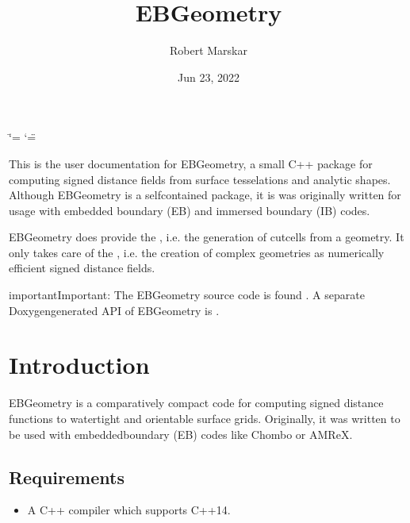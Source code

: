 \documentclass[letterpaper,10pt,english]{sphinxmanual}
\title{EBGeometry}
\date{Jun 23, 2022}
\author{Robert Marskar}
\begin{document}
\ifdefined\shorthandoff
  \ifnum\catcode`\=\string=\active\shorthandoff{=}\fi
  \ifnum\catcode`\"=\active{}\fi
\fi

\pagestyle{empty}
\sphinxmaketitle
\pagestyle{plain}
\sphinxtableofcontents
\pagestyle{normal}
\label{\detokenize{index::doc}}


\sphinxAtStartPar
This is the user documentation for EBGeometry, a small C++ package for computing signed distance fields from surface tesselations and analytic shapes.
Although EBGeometry is a self\sphinxhyphen{}contained package, it is was originally written for usage with embedded boundary (EB) and immersed boundary (IB) codes.

\sphinxAtStartPar
EBGeometry does provide the , i.e. the generation of cut\sphinxhyphen{}cells from a geometry.
It only takes care of the , i.e. the creation of complex geometries as numerically efficient signed distance fields.

\begin{sphinxadmonition}{important}{Important:}
\sphinxAtStartPar
The EBGeometry source code is found .
A separate Doxygen\sphinxhyphen{}generated API of EBGeometry is .
\end{sphinxadmonition}




\chapter{Introduction}
\label{\detokenize{index:introduction}}
\sphinxstepscope
{}\label{\detokenize{Introduction:chap-introduction}}
\sphinxAtStartPar
EBGeometry is a comparatively compact code for computing signed distance functions to watertight and orientable surface grids.
Originally, it was written to be used with embedded\sphinxhyphen{}boundary (EB) codes like Chombo or AMReX.


\section{Requirements}
\label{\detokenize{Introduction:requirements}}\label{\detokenize{Introduction::doc}}\begin{itemize}
\item {} 
\sphinxAtStartPar
A C++ compiler which supports C++14.

\end{itemize}
\end{document}
